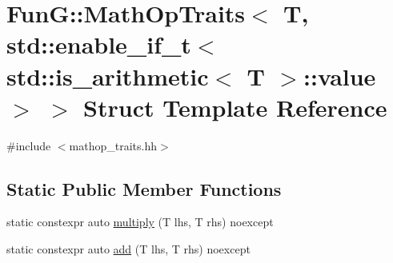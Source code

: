 \hypertarget{structFunG_1_1MathOpTraits_3_01T_00_01std_1_1enable__if__t_3_01std_1_1is__arithmetic_3_01T_01_4_1_1value_01_4_01_4}{\section{Fun\-G\-:\-:Math\-Op\-Traits$<$ T, std\-:\-:enable\-\_\-if\-\_\-t$<$ std\-:\-:is\-\_\-arithmetic$<$ T $>$\-:\-:value $>$ $>$ Struct Template Reference}
\label{structFunG_1_1MathOpTraits_3_01T_00_01std_1_1enable__if__t_3_01std_1_1is__arithmetic_3_01T_01_4_1_1value_01_4_01_4}
}


{\ttfamily \#include $<$mathop\-\_\-traits.\-hh$>$}

\subsection*{Static Public Member Functions}
\begin{DoxyCompactItemize}
\item 
static constexpr auto \hyperlink{structFunG_1_1MathOpTraits_3_01T_00_01std_1_1enable__if__t_3_01std_1_1is__arithmetic_3_01T_01_4_1_1value_01_4_01_4_ac0a15812b088ab59de75d84bd2133489}{multiply} (T lhs, T rhs) noexcept
\item 
static constexpr auto \hyperlink{structFunG_1_1MathOpTraits_3_01T_00_01std_1_1enable__if__t_3_01std_1_1is__arithmetic_3_01T_01_4_1_1value_01_4_01_4_acab509051d7a95f0d58f495641ac9845}{add} (T lhs, T rhs) noexcept
\end{DoxyCompactItemize}


